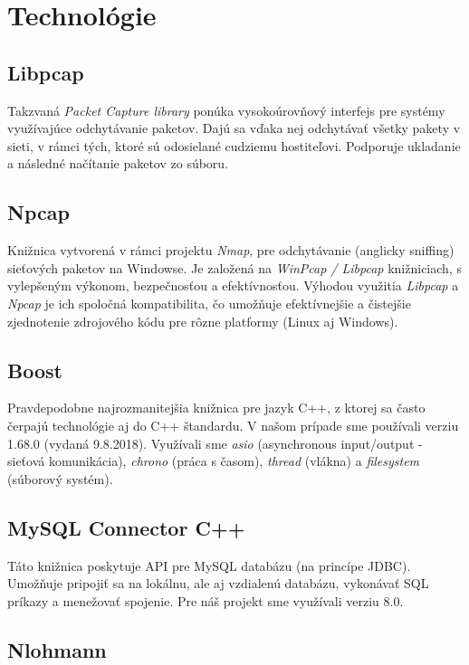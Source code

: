 \documentclass[a4paper,12pt]{article}
\begin{document}
\section{Technológie}
\subsection{Libpcap}

Takzvaná \textit{Packet Capture library} ponúka vysokoúrovňový interfejs pre systémy využívajúce odchytávanie paketov. Dajú sa vďaka nej odchytávať všetky pakety v sieti, v rámci tých, ktoré sú odosielané cudziemu hostiteľovi. Podporuje ukladanie a následné načítanie paketov zo súboru.

\subsection{Npcap}

Knižnica vytvorená v rámci projektu \textit{Nmap}, pre odchytávanie (anglicky sniffing) sieťových paketov na Windowse. Je založená na \textit{WinPcap / Libpcap} knižniciach, s vylepšeným výkonom, bezpečnosťou a efektívnosťou. Výhodou využitia \textit{Libpcap} a \textit{Npcap} je ich spoločná kompatibilita, čo umožňuje efektívnejšie a čistejšie zjednotenie zdrojového kódu pre rôzne platformy (Linux aj Windows).

\subsection{Boost}

Pravdepodobne najrozmanitejšia knižnica pre jazyk C++, z ktorej sa často čerpajú technológie aj do C++ štandardu. V našom prípade sme používali verziu 1.68.0 (vydaná 9.8.2018). Využívali sme \textit{asio} (asynchronous input/output - sieťová komunikácia), \textit{chrono} (práca s časom), \textit{thread} (vlákna) a \textit{filesystem} (súborový systém).

\subsection{MySQL Connector C++}

Táto knižnica poskytuje API pre MySQL databázu (na princípe JDBC). Umožňuje pripojiť sa na lokálnu, ale aj vzdialenú databázu, vykonávať SQL príkazy a menežovať spojenie. Pre náš projekt sme využívali verziu 8.0.

\subsection{Nlohmann}
\end{document}
